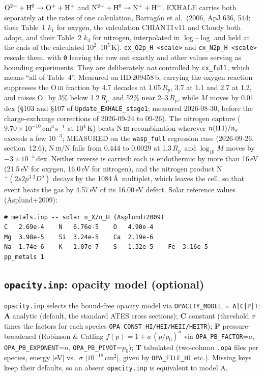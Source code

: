 \documentclass[english,a4paper]{my_memo}
\newcommand{\rp}{\ensuremath{R_p}}   %
\begin{document}
$\rm O^{2+} + H^{0} \rightarrow O^{+} + H^{+}$ and
$\rm N^{2+} + H^{0} \rightarrow N^{+} + H^{+}$.
EXHALE carries both separately at the rates of one calculation, Barrag\'an
et al.\ (2006, ApJ 636, 544; their Table~1 $k_1$ for oxygen, the calculation
CHIANTI\,v11 and Cloudy both adopt, and their Table~2 $k_4$ for nitrogen,
interpolated in $\log$--$\log$ and held at the ends of the calculated
$10^2$--$10^5$\,K). \texttt{cx\_O2p\_H\,<scale>} and
\texttt{cx\_N2p\_H\,<scale>} rescale them, with \texttt{0} leaving the row
out exactly and other values serving as bounding experiments. They are
deliberately \emph{not} controlled by \texttt{cx\_full}, which means ``all of
Table~4''. Measured on HD\,209458\,b,
carrying the oxygen reaction suppresses the O\,\textsc{iii} fraction by 4.7 decades
at 1.05\,\rp, 3.7 at 1.1 and 2.7 at 1.2, and raises O\,\textsc{i} by 3\% below
1.2\,\rp\ and 52\% near 2--3\,\rp, while
$\dot M$ moves by 0.01\,dex (\S103 and \S107 of \texttt{Update\_EXHALE\_stage1};
measured 2026-08-30, before the charge-exchange corrections of 2026-09-24 to
09-26). The nitrogen capture ($9.70\times10^{-10}$\,cm$^3$\,s$^{-1}$ at
$10^4$\,K) beats N\,\textsc{iii} recombination wherever $n({\rm H\,I})/n_e$
exceeds a few $10^{-3}$; MEASURED on the \texttt{wasp\_full} regression case
(2026-09-26, 
section~12.6), N\,\textsc{iii}/N falls from 0.444 to 0.0029 at 1.3\,\rp\ and
$\log_{10}\dot M$ moves by $-3\times10^{-5}$\,dex. Neither reverse is
carried: each is endothermic by more than 16\,eV (21.5\,eV for oxygen,
16.0\,eV for nitrogen), and the nitrogen product N$^+(2s2p^3\,^3D^o)$ decays by
the 1084\,\AA\ multiplet, which leaves the cell, so that event heats the gas by
4.57\,eV of its 16.00\,eV defect. Solar reference
values (Asplund+2009):
\begin{lstlisting}[style=cfg]
# metals.inp -- solar n_X/n_H (Asplund+2009)
C   2.69e-4    N   6.76e-5    O   4.90e-4
Mg  3.98e-5    Si  3.24e-5    Ca  2.19e-6
Na  1.74e-6    K   1.07e-7    S   1.32e-5    Fe  3.16e-5
pp_metals 1
\end{lstlisting}

\subsection{\texttt{opacity.inp}: opacity model (optional)}
\texttt{opacity.inp} selects the bound-free opacity model via
\texttt{OPACITY\_MODEL = A|C|P|T}: \textbf{A} analytic (default, the standard
ATES cross sections); \textbf{C} constant (threshold $\sigma$ times the
factors for each species \texttt{OPA\_CONST\_HI/HEI/HEII/HEITR}); \textbf{P}
pressure-broadened (Robinson \& Catling $f(p)=1+a\,(p/p_0)^n$ via
\texttt{OPA\_PB\_FACTOR}=$a$, \texttt{OPA\_PB\_EXPONENT}=$n$,
\texttt{OPA\_PB\_PIVOT}=$p_0$); \textbf{T} tabulated (two-column
\texttt{.opa} files per species, energy [eV] vs.\ $\sigma$ [$10^{-18}$\,cm$^2$], given by
\texttt{OPA\_FILE\_HI} etc.). Missing keys keep their defaults, so an absent
\texttt{opacity.inp} is equivalent to model A.
\end{document}
